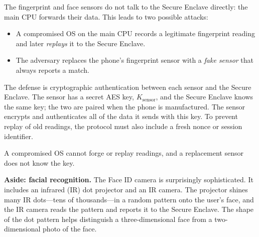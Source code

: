 \documentclass[
  letterpaper,
]{scrbook}
\theoremstyle{definition}
\theoremstyle{plain}
\theoremstyle{plain}
\theoremstyle{remark}
\begin{document}
The fingerprint and face sensors do not talk to the Secure Enclave
directly: the main CPU forwards their data. This leads to two possible
attacks:

\begin{itemize}
\item
  A compromised OS on the main CPU records a legitimate fingerprint
  reading and later \emph{replays} it to the Secure Enclave.
\item
  The adversary replaces the phone's fingerprint sensor with a
  \emph{fake sensor} that always reports a match.

\end{itemize}

The defense is cryptographic authentication between each sensor and the
Secure Enclave. The sensor has a secret AES key, \(K_\text{sensor}\),
and the Secure Enclave knows the same key; the two are paired when the
phone is manufactured. The sensor encrypts and authenticates all of the
data it sends with this key. To prevent replay of old readings, the
protocol must also include a fresh nonce or session identifier.


A compromised OS cannot forge or replay readings, and a replacement
sensor does not know the key.

\textbf{Aside: facial recognition.} The Face ID camera is surprisingly
sophisticated. It includes an infrared (IR) dot projector and an IR
camera. The projector shines many IR dots---tens of thousands---in a
random pattern onto the user's face, and the IR camera reads the pattern
and reports it to the Secure Enclave. The shape of the dot pattern helps
distinguish a three-dimensional face from a two-dimensional photo of the
face.
\end{document}
